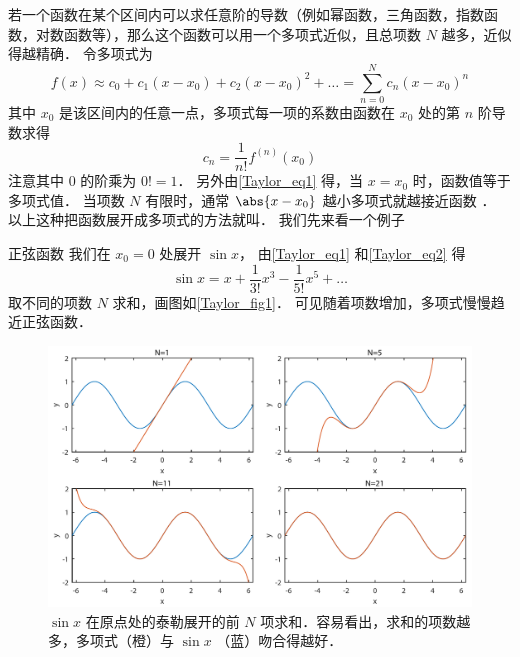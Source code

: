 

若一个函数在某个区间内可以求任意阶的导数（例如幂函数，三角函数，指数函数，对数函数等），那么这个函数可以用一个多项式近似，且总项数 $N$ 越多，近似得越精确． 令多项式为
\begin{equation}\label{Taylor_eq1}
f(x) \approx c_0 + c_1(x - x_0) + c_2(x - x_0)^2 +  \ldots  = \sum_{n = 0}^N  c_n (x - x_0)^n
\end{equation}
其中 $x_0$ 是该区间内的任意一点，多项式每一项的系数由函数在 $x_0$ 处的第 $n$ 阶导数求得
\begin{equation}\label{Taylor_eq2}
c_n = \frac{1}{n!} f^{(n)}(x_0)
\end{equation}
注意其中 0 的阶乘为 $0! = 1$． 另外由\autoref{Taylor_eq1} 得，当 $x=x_0$ 时，函数值等于多项式值． 当项数 $N$ 有限时，通常 $\abs{x-x_0}$ 越小多项式就越接近函数 ． 以上这种把函数展开成多项式的方法就叫． 我们先来看一个例子\\

\begin{exam}{正弦函数}
我们在 $x_0=0$ 处展开 $\sin x$， 由\autoref{Taylor_eq1} 和\autoref{Taylor_eq2} 得
\begin{equation}
\sin x = x + \frac{1}{3!}{x^3} - \frac{1}{5!}{x^5} +  \ldots 
\end{equation}
取不同的项数 $N$ 求和，画图如\autoref{Taylor_fig1}． 可见随着项数增加，多项式慢慢趋近正弦函数．\\
\begin{figure}[ht]
\centering
\includegraphics[width=14cm]{./figures/Taylor.pdf}
\caption{$\sin x$ 在原点处的泰勒展开的前 $N$ 项求和．容易看出，求和的项数越多，多项式（橙）与 $\sin x$ （蓝）吻合得越好．}\label{Taylor_fig1}
\end{figure}
\end{exam}

